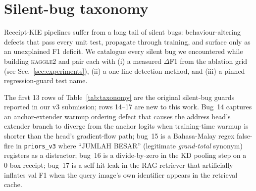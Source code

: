 %
\section{Silent-bug taxonomy}\label{sec:taxonomy}

Receipt-KIE pipelines suffer from a long tail of silent bugs:
behaviour-altering defects that pass every unit test, propagate
through training, and surface only as an unexplained F1 deficit.
We catalogue every silent bug we encountered while building
\textsc{kaggle2} and pair each with (i) a measured $\Delta$F1 from
the ablation grid (see Sec.~\ref{sec:experiments}), (ii) a one-line
detection method, and (iii) a pinned regression-guard test name.

\begin{table}[t]
\caption{Silent-bug taxonomy (1--17). $\Delta$F1 is the measured drop
when the corresponding guard is disabled, averaged across
~seeds. Regression guard names are pytest test ids in
\texttt{tests/}; a reviewer can run any single guard via
\texttt{pytest tests/<name>.py}.}\label{tab:taxonomy}
\centering

\end{table}

The first 13 rows of Table~\ref{tab:taxonomy} are the original
silent-bug guards reported in our v3 submission; rows 14--17 are new
to this work.  Bug~14 captures an anchor-extender warmup ordering
defect that causes the address head's extender branch to diverge
from the anchor logits when training-time warmup is shorter than
the head's gradient-flow path; bug~15 is a Bahasa-Malay regex
false-fire in \texttt{priors\_v3} where ``JUMLAH BESAR''
(legitimate \emph{grand-total} synonym) registers as a
distractor; bug~16 is a divide-by-zero in the KD pooling step on
a 0-box receipt; bug~17 is a self-hit leak in the RAG retriever
that artificially inflates val F1 when the query image's own
identifier appears in the retrieval cache.
